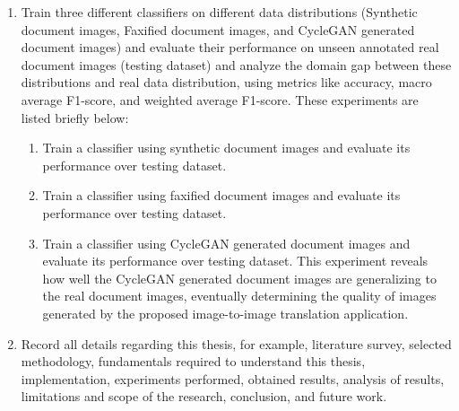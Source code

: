 \begin{enumerate}
\item Train three different classifiers on different data distributions (Synthetic document images, Faxified document images, and \ac{CycleGAN} generated document images) and evaluate their performance on unseen annotated real document images (testing dataset) and analyze the domain gap between these distributions and real data distribution, using metrics like accuracy, macro average F1-score, and weighted average F1-score. These experiments are listed briefly below:
	\begin{enumerate}
	     	\item Train a classifier using synthetic document images and evaluate its performance over testing dataset.
     	     	\item Train a classifier using faxified document images and evaluate its performance over testing dataset.
     		\item Train a classifier using \ac{CycleGAN} generated document images and evaluate its performance over testing dataset. This experiment reveals how well the \ac{CycleGAN} generated document images are generalizing to the real document images, eventually determining the quality of images generated by the proposed image-to-image translation application.
    	\end{enumerate}
\item Record all details regarding this thesis, for example, literature survey, selected methodology, fundamentals required to understand this thesis, implementation, experiments performed, obtained results, analysis of results, limitations and scope of the research, conclusion, and future work.
\end{enumerate}


